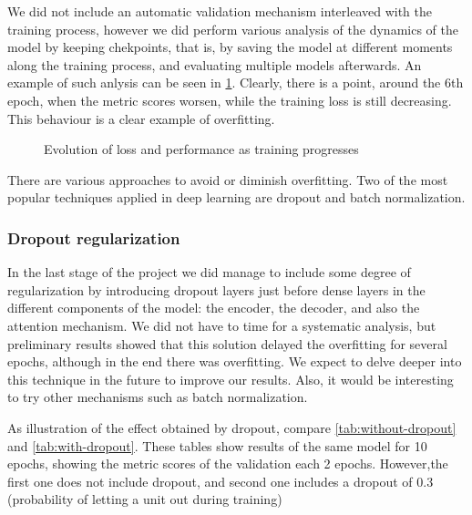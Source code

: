 We did not include an automatic validation mechanism interleaved with the training process, however we did perform various analysis of the dynamics of the model by keeping chekpoints, that is, by saving the model at different moments along the training process, and evaluating multiple models afterwards. An example of such anlysis can be seen in \cref{fig:training_evolution}. Clearly, there is a point, around the 6th epoch, when the metric scores worsen, while the training loss is still decreasing. This behaviour is a clear example of overfitting.


\begin{figure}[hpt]
	\centering
	
	\caption{Evolution of loss and performance as training progresses}
	\label{fig:training_evolution}
\end{figure}

There are various approaches to avoid or diminish overfitting. Two of the most popular techniques applied in deep learning are dropout and batch normalization.

\subsubsection{Dropout regularization}

In the last stage of the project we did manage to include some degree of regularization by introducing dropout layers just before dense layers in the different components of the model: the encoder, the decoder, and also the attention mechanism. We did not have to time for a systematic analysis, but preliminary results showed that this solution delayed the overfitting for several epochs, although in the end there was overfitting. 
We expect to delve deeper into this technique in the future to improve our results. Also, it would be interesting to try other mechanisms such as batch normalization.

As illustration of the effect obtained by dropout, compare \cref{tab:without-dropout} and \cref{tab:with-dropout}. These tables show results of the same model for 10 epochs, showing the metric scores of the validation each 2 epochs. However,the first one does not include dropout, and second one includes a dropout of 0.3 (probability of letting a unit out during training)

